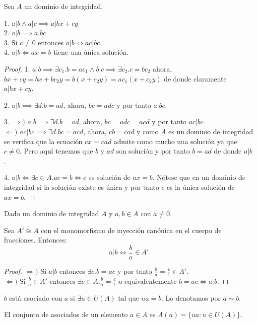 \begin{proposition}
Sea $A$ un dominio de integridad. 

1. $a|b \land a|c \implies a|bx+cy$\\
2. $a|b \implies a|bc$\\
3. Si $c \neq 0$ entonces $a|b \iff ac | bc$.\\
4. $a|b \iff ax = b$ tiene una única solución.
\end{proposition}
\begin{proof}
1. $a|b \implies \exists c_1. b = ac_1 \land b|c \implies \exists c_2. c = bc_2$ ahora, $bx + cy = bx + bc_2y = b(x + c_2y) = ac_1(x+c_2y)$ de donde claramente $a | bx+cy$. 

2. $a|b \implies \exists d. b = ad$, ahora, $bc = adc$ y por tanto $a|bc$. 

3. $\Rightarrow)$ $a|b \implies \exists d. b = ad$, ahora, $bc = adc = acd$ y por tanto $ac|bc$. \\
$\Leftarrow)$ $ac|bc \implies \exists d. bc = acd$, ahora, $cb = cad$ y como $A$ es un dominio de integridad se verifica que la ecuación $cx = cad$ admite como mucho una solución ya que $c \neq 0$. Pero aquí tenemos que $b$ y $ad$ son solución y por tanto $b = ad$ de donde $a|b$. 

4. $a|b \iff \exists c \in A. ac = b \iff c$ es solución de $ax = b$. Nótese que en un dominio de integridad si la solución existe es única y por tanto $c$ es la única solución de $ax = b$. 
\end{proof}

\begin{proposition}
Dado un dominio de integridad $A$ y $a,b \in A$ con $a \neq 0$.

Sea $A' \cong A$ con el monomorfismo de inyección canónica en el cuerpo de fracciones. Entonces: $$a|b \iff \frac{b}{a} \in A'$$ 
\end{proposition}
\begin{proof}
$\Rightarrow)$ Si $a|b$ entonces $\exists c. b = ac$ y por tanto $\frac{b}{a} = \frac{c}{1} \in A'$. \\
$\Leftarrow)$ Si $\frac{b}{a} \in A'$ entonces $\exists c \in A. \frac{b}{a} = \frac{c}{1}$ o equivalentemente $b = ac \iff a | b$. 
\end{proof}

\begin{definition}
$b$ está asociado con $a$ si $\exists u \in U(A)$ tal que $ua = b$. Lo denotamos por $a \sim b$. 

El conjunto de asociados de un elemento $a \in A$ es $A(a) = \{ua:u \in U(A)\}$.
\end{definition}

